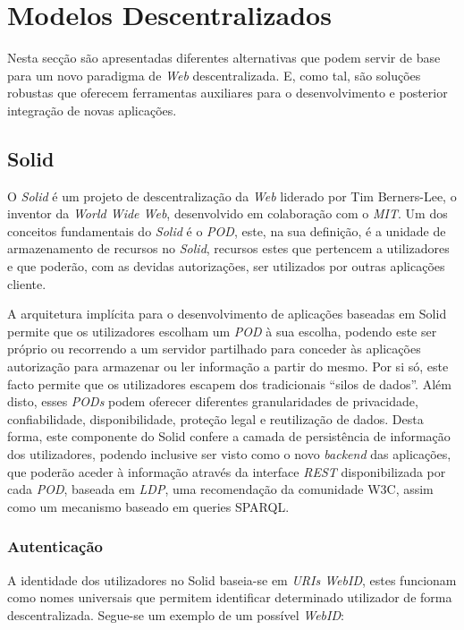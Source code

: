 \section{Modelos Descentralizados \label{section_modelos_descentralizados}}
Nesta secção são apresentadas diferentes alternativas que podem servir de base para um novo paradigma de \emph{Web} descentralizada. E, como tal, são soluções robustas que oferecem ferramentas auxiliares para o desenvolvimento e posterior integração de novas aplicações.

\subsection{Solid \label{estado_arte_solid}}
O \emph{Solid} é um projeto de descentralização da \emph{Web} liderado por Tim Berners-Lee, o inventor da \emph{World Wide Web}, desenvolvido em colaboração com o \emph{\acrfull{MIT}}.
Um dos conceitos fundamentais do \emph{Solid} é o \emph{\acrfull{POD}}, este, na sua definição, é a unidade de armazenamento de recursos no \emph{Solid}, recursos estes que pertencem a utilizadores e que poderão, com as devidas autorizações, ser utilizados por outras aplicações cliente.

A arquitetura implícita para o desenvolvimento de aplicações baseadas em Solid permite que os utilizadores escolham um \emph{\acrshort{POD}} à sua escolha, podendo este ser próprio ou recorrendo a um servidor partilhado para conceder às aplicações autorização para armazenar ou ler informação a partir do mesmo. Por si só, este facto permite que os utilizadores escapem dos tradicionais “silos de dados”. Além disto, esses \emph{PODs} podem oferecer diferentes granularidades de privacidade, confiabilidade, disponibilidade, proteção legal e reutilização de dados\cite{solid_official}. Desta forma, este componente do Solid confere a camada de persistência de informação dos utilizadores, podendo inclusive ser visto como o novo \emph{backend} das aplicações, que poderão aceder à informação através da interface \emph{\acrfull{REST}}\cite{rest_foundations} disponibilizada por cada \emph{\acrshort{POD}}, baseada em \emph{\acrfull{LDP}}, uma recomendação da comunidade W3C, assim como um mecanismo baseado em queries SPARQL\cite{solid_spec}.

\subsubsection{Autenticação \label{section_estado_arte_solid_authentication}}
A identidade dos utilizadores no Solid baseia-se em \emph{URIs WebID}, estes funcionam como nomes universais que permitem identificar determinado utilizador de forma descentralizada. Segue-se um exemplo de um possível \emph{WebID}:

